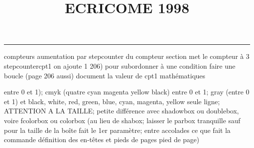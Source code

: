 \documentclass[11pt]{article}%
\title{\bf \vspace{-2cm} ECRICOME 1998} %
\author{} %
\date{} %
\renewcommand{\headrulewidth}{0pt}%
\renewcommand{\footrulewidth}{0.4pt}%
\begin{document}
\maketitle %
\vspace{-1.4cm}\hrule %
\thispagestyle{fancy}

\vspace*{.2cm}



compteurs%
aumentation par stepcounter du compteur section%
met le compteur à 3%
stepcounter{cpt1} on ajoute 1%
206) pour subordonner à une condition %
faire une boucle (page 206 aussi) %
document la valeur de cpt1 
mathématiques\newcommand{\ch}{\operatorname{ch}} 
\newcommand{\sh}{\operatorname{sh}}
\renewcommand{\tanh}{\operatorname{th}}
\renewcommand{\sinh}{\operatorname{sh}}
\renewcommand{\cosh}{\operatorname{ch}}
\newcommand{\argsh}{\operatorname{argsh}}
\newcommand{\argch}{\operatorname{argch}}
\newcommand{\argth}{\operatorname{argth}}
\newcommand{\Id}{\operatorname{Id}}
\renewcommand{\leq}{\leq}
\renewcommand{\geq}{\geq }

\newcommand{\dlim}{\lim}
\newcommand{\dsum}{\sum}
\newcommand{\dint}{\int}
\newcommand{\dprod}{\prod}



entre 0 et 1); cmyk (quatre cyan magenta yellow black) entre 0 et 1;
gray (entre 0 et 1) et black, white, red, green, blue, cyan, magenta,
yellow%
seule ligne; ATTENTION A LA TAILLE; petite différence avec shadowbox ou
doublebox, voire fcolorbox ou colorbox (au lieu de shabox; laisser le
parbox tranquille sauf pour la taille de la boîte
\newcommand{\Tbox}[1]{\begin{center} \shabox{\parbox{0.6
\linewidth}{#1}} \end{center}} %
fait le 1er paramètre; entre accolades ce que fait la commande
définition des en-têtes et pieds de pages\pagestyle{fancy}
\chead{}
\rfoot[ \ \thepage]{\thepage}
\cfoot{}
\lfoot{}
\thispagestyle{fancy} %
pied de page)\renewcommand{\footrulewidth}{0.4pt}
\renewcommand{\headrulewidth}{0.4pt}
\end{document}

